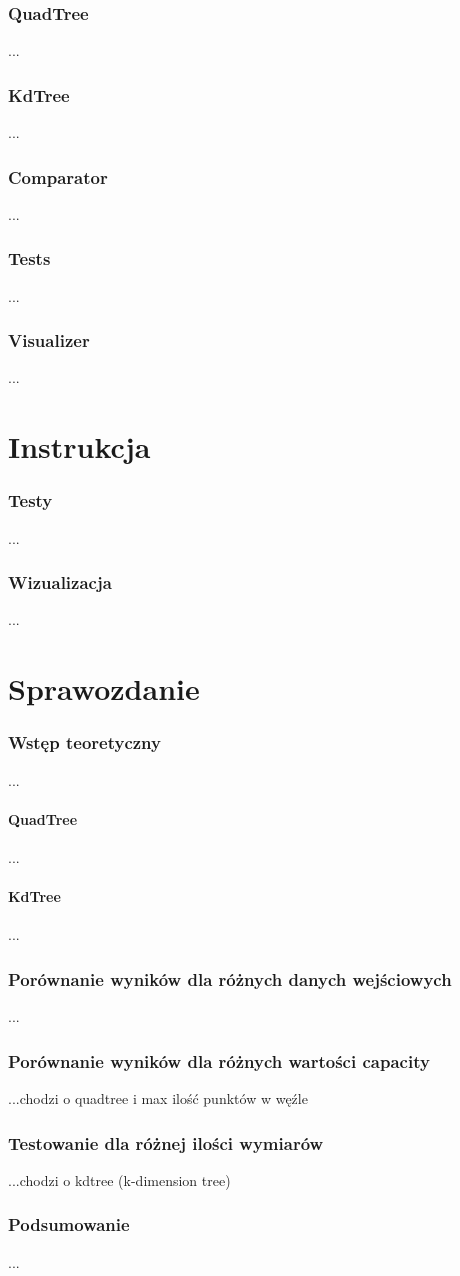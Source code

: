 \documentclass{lab}
\begin{document}
\section{QuadTree}
...
\section{KdTree}
...
\section{Comparator}
...
\section{Tests}
...
\section{Visualizer}
...

\part{Instrukcja}
\section{Testy}
...
\section{Wizualizacja}
...

\part{Sprawozdanie}
\section{Wstęp teoretyczny}
...
\subsection{QuadTree}
...
\subsection{KdTree}
...
\section{Porównanie wyników dla różnych danych wejściowych}
...
\section{Porównanie wyników dla różnych wartości capacity}
...chodzi o quadtree i max ilość punktów w węźle
\section{Testowanie dla różnej ilości wymiarów}
...chodzi o kdtree (k-dimension tree)
\section{Podsumowanie}
...
\end{document}
